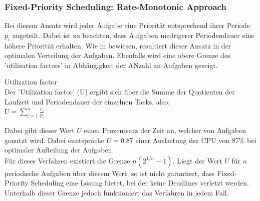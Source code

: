 \subsubsection{Fixed-Priority Scheduling: Rate-Monotonic Approach}
\label{2.7.5}
Bei diesem Ansatz wird jeder Aufgabe eine Priorität entsprechend ihrer Periode $p_i$ zugeteilt. Dabei ist zu beachten, dass Aufgaben niedrigerer Periodendauer eine höhere Priorität erhalten. Wie in \cite[p. 102f]{RTS} bewiesen, resultiert dieser Ansatz in der optimalen Verteilung der Aufgaben. Ebenfalls wird eine obere Grenze des 'utilization factors' in Abhängigkeit der ANzahl an Aufgaben gezeigt.\\
\begin{definition}{Utilization factor}\\
Der 'Utilization factor' (U) ergibt sich über die Summe der Quotienten der Laufzeit und Periodendauer der einzelnen Tasks, also:\\
$U = \sum\limits_{i=1}^n \frac{e_i}{p_i}$\\
\end{definition}
Dabei gibt dieser Wert $U$ einen Prozentsatz der Zeit an, welcher von Aufgaben genutzt wird. Dabei enntspräche $U=0.87$ einer Auslastung der CPU von 87\% bei optimaler Aufteilung der Aufgaben.\\
Für dieses Verfahren existiert die Grenze $n(2^{1/n} - 1)$. Liegt der Wert $U$ für $n$ periodische Aufgaben über diesem Wert, so ist nicht garantiert, dass Fixed-Priority Scheduling eine Lösung bietet, bei der keine Deadlines verletzt werden. Unterhalb dieser Grenze jedoch funktioniert das Verfahren in jedem Fall.

